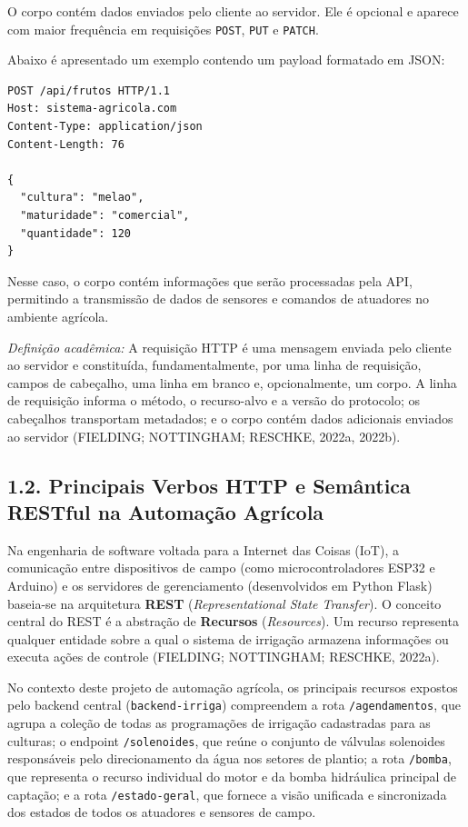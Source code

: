 O corpo contém dados enviados pelo cliente ao servidor. Ele é opcional e aparece com maior frequência em requisições \texttt{POST}, \texttt{PUT} e \texttt{PATCH}.

Abaixo é apresentado um exemplo contendo um payload formatado em JSON:

\begin{lstlisting}
POST /api/frutos HTTP/1.1
Host: sistema-agricola.com
Content-Type: application/json
Content-Length: 76

{
  "cultura": "melao",
  "maturidade": "comercial",
  "quantidade": 120
}
\end{lstlisting}

Nesse caso, o corpo contém informações que serão processadas pela API, permitindo a transmissão de dados de sensores e comandos de atuadores no ambiente agrícola.

\textit{Definição acadêmica:} A requisição HTTP é uma mensagem enviada pelo cliente ao servidor e constituída, fundamentalmente, por uma linha de requisição, campos de cabeçalho, uma linha em branco e, opcionalmente, um corpo. A linha de requisição informa o método, o recurso-alvo e a versão do protocolo; os cabeçalhos transportam metadados; e o corpo contém dados adicionais enviados ao servidor (FIELDING; NOTTINGHAM; RESCHKE, 2022a, 2022b).

\subsection*{1.2. Principais Verbos HTTP e Semântica RESTful na Automação Agrícola}

Na engenharia de software voltada para a Internet das Coisas (IoT), a comunicação entre dispositivos de campo (como microcontroladores ESP32 e Arduino) e os servidores de gerenciamento (desenvolvidos em Python Flask) baseia-se na arquitetura \textbf{REST} (\textit{Representational State Transfer}). O conceito central do REST é a abstração de \textbf{Recursos} (\textit{Resources}). Um recurso representa qualquer entidade sobre a qual o sistema de irrigação armazena informações ou executa ações de controle (FIELDING; NOTTINGHAM; RESCHKE, 2022a).

No contexto deste projeto de automação agrícola, os principais recursos expostos pelo backend central (\texttt{backend-irriga}) compreendem a rota \texttt{/agendamentos}, que agrupa a coleção de todas as programações de irrigação cadastradas para as culturas; o endpoint \texttt{/solenoides}, que reúne o conjunto de válvulas solenoides responsáveis pelo direcionamento da água nos setores de plantio; a rota \texttt{/bomba}, que representa o recurso individual do motor e da bomba hidráulica principal de captação; e a rota \texttt{/estado-geral}, que fornece a visão unificada e sincronizada dos estados de todos os atuadores e sensores de campo.

